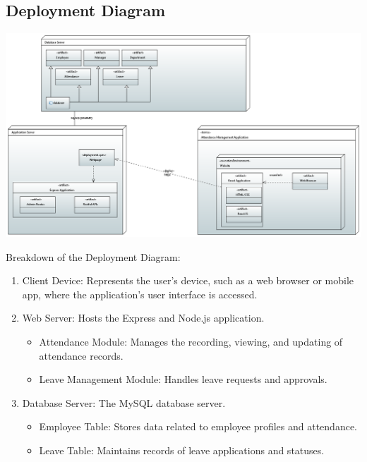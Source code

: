\documentclass[a4paper, 12pt]{article}
\begin{document}
\subsection{Deployment Diagram}
\begin{center}
\includegraphics[width=1\textwidth]{Attendance_Management_System_Deployment_Diagram.PNG}\par
\end{center}
Breakdown of the Deployment Diagram:
\begin{enumerate}
    \item Client Device: Represents the user’s device, such as a web browser or mobile app, where the application’s user interface is accessed.
    \item Web Server: Hosts the Express and Node.js application.
    \begin{itemize}
        \item Attendance Module: Manages the recording, viewing, and updating of attendance records.
        \item Leave Management Module: Handles leave requests and approvals.
    \end{itemize}
    \item Database Server: The MySQL database server.
    \begin{itemize}
        \item Employee Table: Stores data related to employee profiles and attendance.
        \item Leave Table: Maintains records of leave applications and statuses.
    \end{itemize}
\end{enumerate}

\newpage
\end{document}
